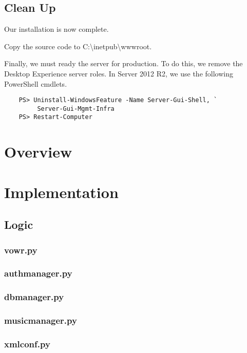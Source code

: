 \documentclass{book}
\renewcommand{\,}{\kern0.2ex}
\begin{document}
	
	\subsection{Clean Up}
	Our installation is now complete.
	
	Copy the source code to C:\textbackslash inetpub\textbackslash wwwroot.
	
	Finally, we must ready the server for production. To do this, we remove the Desktop Experience server roles. In Server 2012 R2, we use the following PowerShell cmdlets.
	
	\begin{verbatim}
	PS> Uninstall-WindowsFeature -Name Server-Gui-Shell, `
	     Server-Gui-Mgmt-Infra
	PS> Restart-Computer
	\end{verbatim}
	
	\section{Overview}
	
	
	\section{Implementation}
	\subsection{Logic}
	\subsubsection{vowr.py}
	
	\subsubsection{auth\textunderscore manager.py}
	
	\subsubsection{db\textunderscore manager.py}
	
	\subsubsection{music\textunderscore manager.py}
	
	\subsubsection{xmlconf.py}
	
\end{document}
